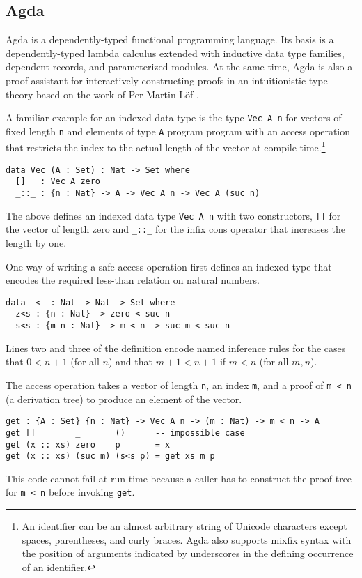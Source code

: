 \documentclass{llncs}
\begin{document}
\subsection{Agda}
\label{sec:agda}

Agda \cite{Norell2008,BoveDybjerNorell2009} is a dependently-typed
functional programming language. Its basis is a dependently-typed
lambda calculus extended with inductive data type families, dependent
records, and parameterized modules. At the same time, Agda is also a
proof assistant for interactively constructing proofs in an
intuitionistic type theory based on the work of Per Martin-L\"of
\cite{MartinLoef1984}. 

A familiar example for an indexed data type is the type
\verb+Vec A n+ for vectors of fixed length \verb+n+ and elements of
type \verb+A+ program program with an access operation that restricts the index to the
actual length of the vector at compile time.\footnote{An
  identifier can be an almost arbitrary 
  string of Unicode characters except spaces, parentheses, and curly
  braces. Agda also supports mixfix syntax with the position of
  arguments indicated by underscores in the defining occurrence of an
  identifier.} 
\begin{verbatim}
data Vec (A : Set) : Nat -> Set where
  []   : Vec A zero
  _::_ : {n : Nat} -> A -> Vec A n -> Vec A (suc n)
\end{verbatim}
The above defines an indexed data type \verb+Vec A n+ with two
constructors, \verb+[]+ for the vector of length zero and 
\verb+_::_+ for the infix cons operator that increases the length by one.

One way of writing a safe access operation first defines an indexed
type that encodes the required less-than relation on natural numbers.
\begin{verbatim}
data _<_ : Nat -> Nat -> Set where
  z<s : {n : Nat} -> zero < suc n
  s<s : {m n : Nat} -> m < n -> suc m < suc n
\end{verbatim}
Lines two and three of the definition encode named inference rules for
the cases that $0 < n+1$ (for all $n$) and that $m+1 < n+1$ if $m < n$
(for all $m,n$).

The access operation takes a vector of length \verb+n+, an index
\verb+m+, and a proof of \verb+m < n+ (a derivation tree) to produce
an element of the vector.  
\begin{verbatim}
get : {A : Set} {n : Nat} -> Vec A n -> (m : Nat) -> m < n -> A
get []        _       ()      -- impossible case
get (x :: xs) zero    p       = x
get (x :: xs) (suc m) (s<s p) = get xs m p
\end{verbatim}
This code cannot fail at run time because a caller has to
construct the proof tree for \verb+m < n+ before invoking \verb+get+.
\end{document}
